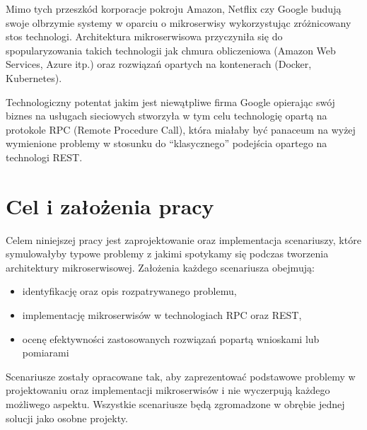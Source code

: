 Mimo tych przeszkód korporacje pokroju Amazon, Netflix czy Google budują swoje olbrzymie systemy w oparciu o mikroserwisy wykorzystując zróżnicowany stos technologi. Architektura mikroserwisowa przyczyniła się do spopularyzowania takich technologii jak chmura obliczeniowa (Amazon Web Services, Azure itp.) oraz rozwiązań opartych na kontenerach (Docker, Kubernetes). \par Technologiczny potentat jakim jest niewątpliwe firma Google opierając swój biznes na usługach sieciowych stworzyła w tym celu technologię opartą na protokole RPC (Remote Procedure Call), która miałaby być panaceum na wyżej wymienione problemy w stosunku do \enquote{klasycznego} podejścia opartego na technologi REST\@.
\section{Cel i założenia pracy}
Celem niniejszej pracy jest zaprojektowanie oraz implementacja scenariuszy, które symulowałyby typowe problemy z jakimi spotykamy się podczas tworzenia architektury mikroserwisowej. Założenia każdego scenariusza obejmują:
\begin{itemize}
	\item identyfikację oraz opis rozpatrywanego problemu,
	\item implementację mikroserwisów w technologiach RPC oraz REST,
	\item ocenę efektywności zastosowanych rozwiązań popartą wnioskami lub pomiarami
\end{itemize}
\par Scenariusze zostały opracowane tak, aby zaprezentować podstawowe problemy w projektowaniu oraz implementacji mikroserwisów i nie wyczerpują każdego możliwego aspektu. Wszystkie scenariusze będą zgromadzone w obrębie jednej solucji jako osobne projekty.